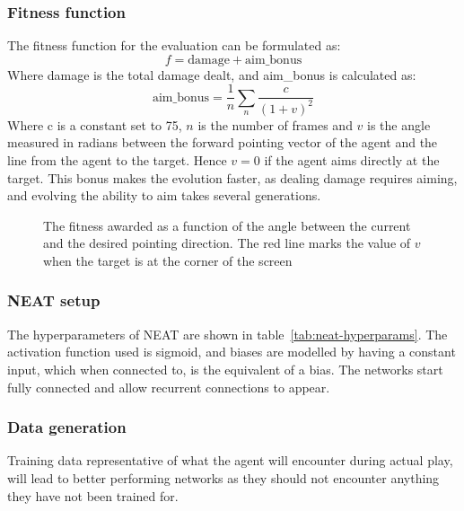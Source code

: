 \subsubsection{Fitness function}
The fitness function for the evaluation can be formulated as:
$$f = \text{damage} + \text{aim\_bonus}$$
Where damage is the total damage dealt, and aim\_bonus is calculated as:
$$ \text{aim\_bonus} = \frac{1}{n} \sum_{n} \frac{c}{(1+v)^2} $$
Where c is a constant set to 75, $n$ is the number of frames and $v$ is the angle measured in radians between the forward pointing vector of the agent and the line from the agent to the target. Hence $v = 0$ if the agent aims directly at the target. This bonus makes the evolution faster, as dealing damage requires aiming, and evolving the ability to aim takes several generations.
\begin{figure}[H]
\centering
{}
\caption[Fitness function used for neuroevolution]{The fitness awarded as a function of the angle between the current and the desired pointing direction. The red line marks the value of $v$ when the target is at the corner of the screen}
\end{figure}

\subsubsection{NEAT setup}
The hyperparameters of NEAT are shown in table~\ref{tab:neat-hyperparams}. The activation function used is sigmoid, and biases are modelled by having a constant input, which when connected to, is the equivalent of a bias. The networks start fully connected and allow recurrent connections to appear.


\subsubsection{Data generation}
\label{subsub:data-gen}
Training data representative of what the agent will encounter during actual play, will lead to better performing networks as they should not encounter anything they have not been trained for.

